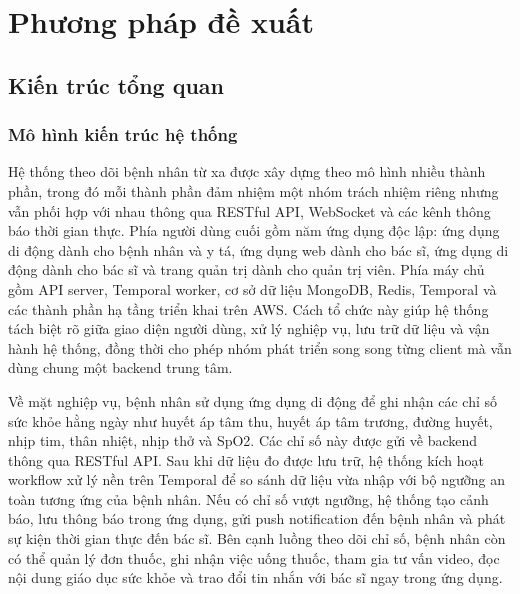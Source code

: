 \chapter{Phương pháp đề xuất}
\label{Chapter3}

\section{Kiến trúc tổng quan}

\subsection{Mô hình kiến trúc hệ thống}
\par Hệ thống theo dõi bệnh nhân từ xa được xây dựng theo mô hình nhiều thành phần, trong đó mỗi thành phần đảm nhiệm một nhóm trách nhiệm riêng nhưng vẫn phối hợp với nhau thông qua RESTful API, WebSocket và các kênh thông báo thời gian thực. Phía người dùng cuối gồm năm ứng dụng độc lập: ứng dụng di động dành cho bệnh nhân và y tá, ứng dụng web dành cho bác sĩ, ứng dụng di động dành cho bác sĩ và trang quản trị dành cho quản trị viên. Phía máy chủ gồm API server, Temporal worker, cơ sở dữ liệu MongoDB, Redis, Temporal và các thành phần hạ tầng triển khai trên AWS. Cách tổ chức này giúp hệ thống tách biệt rõ giữa giao diện người dùng, xử lý nghiệp vụ, lưu trữ dữ liệu và vận hành hệ thống, đồng thời cho phép nhóm phát triển song song từng client mà vẫn dùng chung một backend trung tâm.

\par Về mặt nghiệp vụ, bệnh nhân sử dụng ứng dụng di động để ghi nhận các chỉ số sức khỏe hằng ngày như huyết áp tâm thu, huyết áp tâm trương, đường huyết, nhịp tim, thân nhiệt, nhịp thở và SpO2. Các chỉ số này được gửi về backend thông qua RESTful API. Sau khi dữ liệu đo được lưu trữ, hệ thống kích hoạt workflow xử lý nền trên Temporal để so sánh dữ liệu vừa nhập với bộ ngưỡng an toàn tương ứng của bệnh nhân. Nếu có chỉ số vượt ngưỡng, hệ thống tạo cảnh báo, lưu thông báo trong ứng dụng, gửi push notification đến bệnh nhân và phát sự kiện thời gian thực đến bác sĩ. Bên cạnh luồng theo dõi chỉ số, bệnh nhân còn có thể quản lý đơn thuốc, ghi nhận việc uống thuốc, tham gia tư vấn video, đọc nội dung giáo dục sức khỏe và trao đổi tin nhắn với bác sĩ ngay trong ứng dụng.


